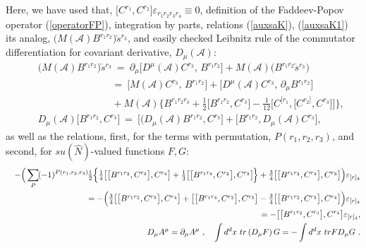\documentclass[10pt]{article}
\begin{document}
Here, we have used that, $\big[C^{r_1},C^{r_2}\big]\varepsilon_{r_1r_2r_3r_4}\equiv 0$, definition of the Faddeev-Popov operator (\ref{operatorFP}), integration by parts, relations (\ref{auxsaK}),  (\ref{auxsaK1}) its analog, $\big(M(\mathcal{A})B^{r_1r_2}\big)\overleftarrow{s}{}^{r_3}$,    and easily checked  Leibnitz rule of the commutator differentiation for covariant derivative, $D_\mu(\mathcal{A})$:
\begin{eqnarray}
&& \big(M(\mathcal{A})B^{r_1r_2}\big)\overleftarrow{s}{}^{r_3}  \ =\    \partial_\mu \big[D^\mu(\mathcal{A}) C^{r_3},\,B^{r_1r_2}\big] + M(\mathcal{A})\big(B^{r_1r_2}\overleftarrow{s}{}^{r_3}\big) \nonumber \\
 && \phantom{\big(M(\mathcal{A})B^{r_1r_2}\big)\overleftarrow{s}{}^{p}}\ = \ \big[M(\mathcal{A}) C^{r_3},\,B^{r_1r_2}\big] +\big[D^\mu(\mathcal{A}) C^{r_3},\, \partial_\mu B^{r_1r_2}\big] \nonumber \\
 && \phantom{\big(M(\mathcal{A})B^{r_1r_2}\big)\overleftarrow{s}{}^{p}}\  + M(\mathcal{A})\Big\{{B}^{r_1r_2r_3}+ \textstyle\frac{1}{2}
\big[B^{r_1r_2}, C^{r_3}\big]-\frac{1}{12}\big[C^{[r_1},\big[C^{r_2]},C^{r_3}\big]\big]\Big\}
, \label{auxsaK2} \\
\label{dercovcomm}
  && D_\mu(\mathcal{A})\big[B^{r_1r_2}, C^{r_3}\big] \ = \ \big[\big(D_\mu(\mathcal{A})B^{r_1r_2}, C^{r_3}\big]+\big[B^{r_1r_2}, D_\mu(\mathcal{A})C^{r_3}\big],
\end{eqnarray}
as well as the relations, first, for the terms with permutation, $P(r_1,r_2,r_3)$, and second,  for $su(\hat{N})$-valued functions $F, G$:
\begin{eqnarray}
&&   -\Big(\displaystyle\sum_{P}\hspace{-0.15em}(-1)^{P(r_1,r_2,r_3)}\hspace{-0.1em}\textstyle\frac{1}{2}\Big\{\textstyle\frac{1}{4}\big[\big[B^{r_1r_2},C^{r_3}\big],C^{r_4}\big] +\frac{1}{3} \big[\big[B^{r_1r_4},C^{r_2}\big],C^{r_3}\big] \hspace{-0.1em} \Big\}  + \textstyle\frac{3}{4}
\big[\big[B^{r_1r_2}, C^{r_4}\big], C^{r_3}\big] \Big)\varepsilon_{[r]_4}\nonumber \\
 && \quad = -\Big( \textstyle\frac{3}{4}\big[\big[B^{r_1r_2},C^{r_3}\big],C^{r_4}\big]  + \big[\big[B^{r_1r_4},C^{r_2}\big],C^{r_3}\big] -  \textstyle\frac{3}{4}
\big[\big[B^{r_1r_2}, C^{r_3}\big], C^{r_4}\big] \Big)\varepsilon_{[r]_4}\nonumber \\
 && \quad =   -\big[\big[B^{r_1r_2}, C^{r_3}\big], C^{r_4}\big]\varepsilon_{[r]_4}, \label{permBr1234}\\
&&  D_{\mu}A^{\mu}=  \partial_{\mu}A^{\mu}\ ,\ \ \ \int d^{d}x\ tr \left(
D_{\mu}F\right)  G=-\int d^{d}x\ tr F D_{\mu}G\ .
\label{idDmu}%
\end{eqnarray}
\end{document}
